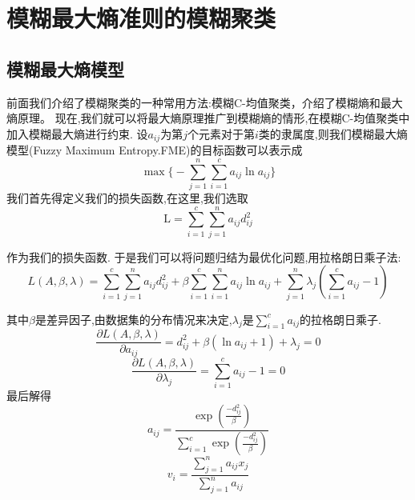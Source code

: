 \chapter[模糊最大熵准则的模糊聚类模型]{模糊最大熵准则的模糊聚类}

\section{模糊最大熵模型}
前面我们介绍了模糊聚类的一种常用方法:模糊C-均值聚类，介绍了模糊熵和最大熵原理。
现在,我们就可以将最大熵原理推广到模糊熵的情形,在模糊C-均值聚类中加入模糊最大熵进行约束.
设$a_{i j}$为第$j$个元素对于第$i$类的隶属度,则我们模糊最大熵模型(Fuzzy Maximum Entropy.FME)的目标函数可以表示成
\begin{equation}
    \max \biggl\{-\sum_{j=1}^{n} \sum_{i=1}^{c} a_{i j}\ln a_{i j}\biggr\}
    \label{MEC}
\end{equation}
我们首先得定义我们的损失函数,在这里,我们选取
\begin{equation*}
    \mathrm{L}=\sum_{i=1}^{c} \sum_{j=1}^{n}a_{i j} d_{i j}^2
\end{equation*}

作为我们的损失函数.
于是我们可以将问题归结为最优化问题,用拉格朗日乘子法:
\begin{equation}
    L(A,\beta ,\lambda)=\sum_{i=1}^{c} \sum_{j=1}^{n} a_{i j} d_{i j}^2+\beta \sum_{i=1}^{c} \sum_{i=1}^{n} a_{i j} \ln a_{i j}+\sum_{j=1}^{n} \lambda_{j}\left(\sum_{i=1}^{c} a_{i j}-1\right)
    \label{MLagrange}
\end{equation}

其中$\beta$是差异因子,由数据集的分布情况来决定,$\lambda_j$是$\sum\limits_{i=1}^{c} a_{i j}$的拉格朗日乘子.
\begin{equation}
    \frac{\partial L(A,\beta ,\lambda) }{\partial a_{i j}} =d_{i j}^2+\beta(\ln a_{i j}+1)+\lambda_j=0
\end{equation}
\begin{equation}
    \frac{\partial L(A,\beta ,\lambda)}{\partial \lambda_j}=\sum_{i=1}^{c} a_{i j}-1=0
\end{equation}
最后解得
\begin{equation}
    a_{i j}=\frac{ \exp(\frac{-d_{i j}^2}{\beta})}{\sum\limits_{i=1}^c\exp(\frac{-d_{i j}^2}{\beta})}
    \label{Maij}
\end{equation}
\begin{equation}
    v_i =\frac{\sum\limits_{j=1}^n a_{i j} x_j}{\sum\limits_{j=1}^n a_{i j}}
    \label{Mvij}
\end{equation}

